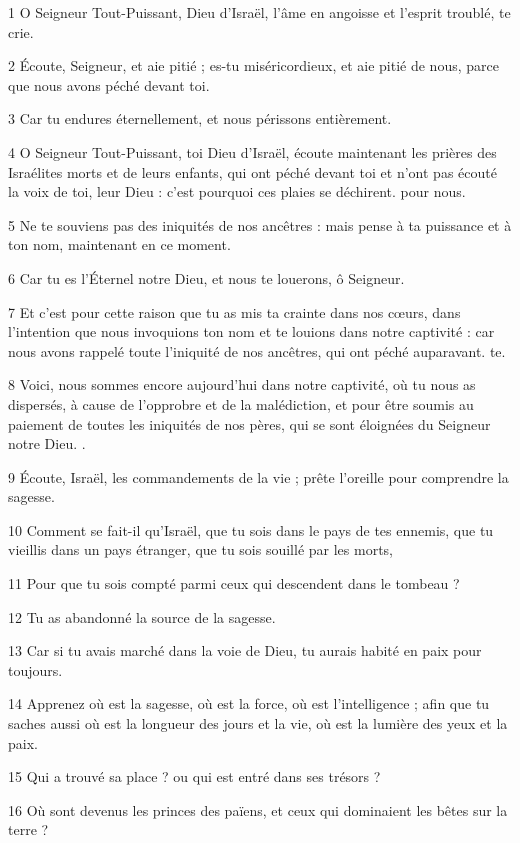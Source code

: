 \par 1 O Seigneur Tout-Puissant, Dieu d'Israël, l'âme en angoisse et l'esprit troublé, te crie.
\par 2 Écoute, Seigneur, et aie pitié ; es-tu miséricordieux, et aie pitié de nous, parce que nous avons péché devant toi.
\par 3 Car tu endures éternellement, et nous périssons entièrement.
\par 4 O Seigneur Tout-Puissant, toi Dieu d'Israël, écoute maintenant les prières des Israélites morts et de leurs enfants, qui ont péché devant toi et n'ont pas écouté la voix de toi, leur Dieu : c'est pourquoi ces plaies se déchirent. pour nous.
\par 5 Ne te souviens pas des iniquités de nos ancêtres : mais pense à ta puissance et à ton nom, maintenant en ce moment.
\par 6 Car tu es l'Éternel notre Dieu, et nous te louerons, ô Seigneur.
\par 7 Et c'est pour cette raison que tu as mis ta crainte dans nos cœurs, dans l'intention que nous invoquions ton nom et te louions dans notre captivité : car nous avons rappelé toute l'iniquité de nos ancêtres, qui ont péché auparavant. te.
\par 8 Voici, nous sommes encore aujourd'hui dans notre captivité, où tu nous as dispersés, à cause de l'opprobre et de la malédiction, et pour être soumis au paiement de toutes les iniquités de nos pères, qui se sont éloignées du Seigneur notre Dieu. .
\par 9 Écoute, Israël, les commandements de la vie ; prête l'oreille pour comprendre la sagesse.
\par 10 Comment se fait-il qu'Israël, que tu sois dans le pays de tes ennemis, que tu vieillis dans un pays étranger, que tu sois souillé par les morts,
\par 11 Pour que tu sois compté parmi ceux qui descendent dans le tombeau ?
\par 12 Tu as abandonné la source de la sagesse.
\par 13 Car si tu avais marché dans la voie de Dieu, tu aurais habité en paix pour toujours.
\par 14 Apprenez où est la sagesse, où est la force, où est l'intelligence ; afin que tu saches aussi où est la longueur des jours et la vie, où est la lumière des yeux et la paix.
\par 15 Qui a trouvé sa place ? ou qui est entré dans ses trésors ?
\par 16 Où sont devenus les princes des païens, et ceux qui dominaient les bêtes sur la terre ?
